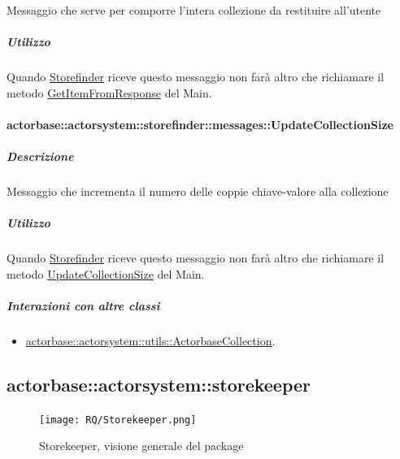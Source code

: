 \documentclass{scalatekids-article}
\begin{document}
Messaggio che serve per comporre l'intera collezione da restituire all'utente

\subparagraph{Utilizzo}

Quando \hyperref[sec:actorbase::actorsystem::storefinder::Storefinder]{Storefinder}
riceve questo messaggio non farà altro che richiamare il metodo
\hyperref[sec:actorbase::actorsystem::main::messages::GetItemFromResponse]{GetItemFromResponse} del Main.

\paragraph{actorbase::actorsystem::storefinder::messages::UpdateCollectionSize}
\label{sec:actorbase::actorsystem::storefinder::messages::UpdateCollectionSize}

\subparagraph{Descrizione}

Messaggio che incrementa il numero delle coppie chiave-valore alla collezione

\subparagraph{Utilizzo}

Quando \hyperref[sec:actorbase::actorsystem::storefinder::Storefinder]{Storefinder}
riceve questo messaggio non farà altro che richiamare il metodo
\hyperref[sec:actorbase::actorsystem::main::messages::UpdateCollectionSize]{UpdateCollectionSize} del Main.

\subparagraph{Interazioni con altre classi}
\begin{itemize}
\item \hyperref[sec:actorbase::actorsystem::utils::ActorbaseCollection]{actorbase::actorsystem::utils::ActorbaseCollection}.
\end{itemize}


\subsection{actorbase::actorsystem::storekeeper}
\label{sec:actorbase::actorsystem::storekeeper}

\begin{figure}[H]
  \begin{center}
    \texttt{[image: RQ/Storekeeper.png]}
    \caption{Storekeeper, visione generale del package}
  \end{center}
\end{figure}
\end{document}
